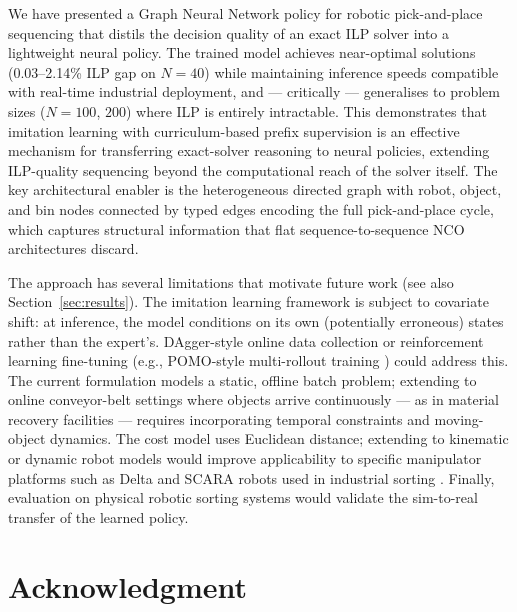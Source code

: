 \documentclass[conference]{IEEEtran}
\begin{document}
We have presented a Graph Neural Network policy for robotic pick-and-place sequencing that distils the decision quality of an exact ILP solver into a lightweight neural policy. The trained model achieves near-optimal solutions (0.03--2.14\% ILP gap on $N{=}40$) while maintaining inference speeds compatible with real-time industrial deployment, and --- critically --- generalises to problem sizes ($N{=}100$, $200$) where ILP is entirely intractable. This demonstrates that imitation learning with curriculum-based prefix supervision is an effective mechanism for transferring exact-solver reasoning to neural policies, extending ILP-quality sequencing beyond the computational reach of the solver itself. The key architectural enabler is the heterogeneous directed graph with robot, object, and bin nodes connected by typed edges encoding the full pick-and-place cycle, which captures structural information that flat sequence-to-sequence NCO architectures discard.

The approach has several limitations that motivate future work (see also Section~\ref{sec:results}). The imitation learning framework is subject to covariate shift: at inference, the model conditions on its own (potentially erroneous) states rather than the expert's. DAgger-style online data collection \cite{ross2011dagger} or reinforcement learning fine-tuning (e.g., POMO-style multi-rollout training \cite{kwon2020pomo}) could address this. The current formulation models a static, offline batch problem; extending to online conveyor-belt settings where objects arrive continuously --- as in material recovery facilities --- requires incorporating temporal constraints and moving-object dynamics. The cost model uses Euclidean distance; extending to kinematic or dynamic robot models would improve applicability to specific manipulator platforms such as Delta and SCARA robots used in industrial sorting \cite{han2019pap}. Finally, evaluation on physical robotic sorting systems would validate the sim-to-real transfer of the learned policy.

\section*{Acknowledgment}
\end{document}

